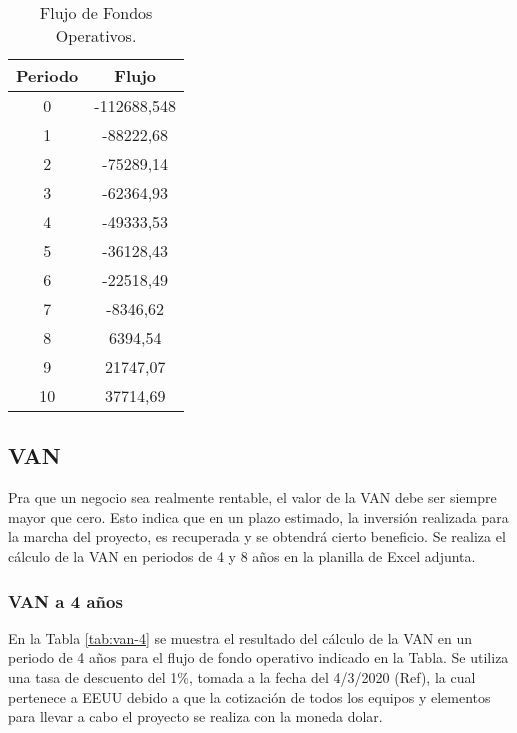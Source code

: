 \begin{table}[H]
  \tiny
  \centering
    \begin{tabular}{|c|c|}
    \hline
    \rowcolor[rgb]{ .773,  .851,  .945} \textbf{Periodo} & \textbf{Flujo} \bigstrut\\
    \hline
    0     & -112688,548 \bigstrut\\
    \hline
    1     & -88222,68 \bigstrut\\
    \hline
    2     & -75289,14 \bigstrut\\
    \hline
    3     & -62364,93 \bigstrut\\
    \hline
    4     & -49333,53 \bigstrut\\
    \hline
    5     & -36128,43 \bigstrut\\
    \hline
    6     & -22518,49 \bigstrut\\
    \hline
    7     & -8346,62 \bigstrut\\
    \hline
    8     & 6394,54 \bigstrut\\
    \hline
    9     & 21747,07 \bigstrut\\
    \hline
    10    & 37714,69 \bigstrut\\
    \hline
    \end{tabular}%
     \caption{Flujo de Fondos Operativos.}
  \label{tab:flujo-fondos-operativos}%
\end{table}%





\subsection{VAN}

Pra que un negocio sea realmente rentable, el valor de la VAN debe ser siempre mayor que cero. Esto indica que en un plazo estimado, la inversión realizada para la marcha del proyecto, es recuperada y se obtendrá cierto beneficio. Se realiza el cálculo de la VAN en periodos de 4 y 8 años en la planilla de Excel adjunta.

\subsubsection{VAN a 4 años}

En la Tabla \ref{tab:van-4} se muestra el resultado del cálculo de la VAN en un periodo de 4 años para el flujo de fondo operativo indicado en la Tabla. Se utiliza una tasa de descuento del  1\%, tomada a la fecha del 4/3/2020 (Ref), la cual pertenece a EEUU debido a que la cotización de todos los equipos y elementos para llevar a cabo el proyecto se realiza con la moneda dolar.

